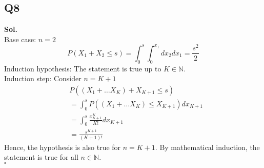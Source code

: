\documentclass[12pt]{article}
\begin{document}
\subsection*{Q8}
\textbf{Sol.} \\
Base case: \(n = 2\)
\[
   P(X_1 + X_2 \leq  s) = \int_0^s \int_0^{x_1}  dx_2 dx_1 = \frac{s^2}{2}   
\] 
Induction hypothesis: The statement is true up to \(K \in \mathbb{N}\). \\ 
Induction step: Consider \(n = K +1\)
\begin{equation*}
    \begin{aligned}
        & P((X_1 + \dots X_K) + X_{K+1} \leq s)
        \\ &= \int_0^s P( (X_1 + \dots X_K) \leq  X_{K+1} ) dx_{K+1} 
        \\ &= \int_0^s \frac{x_{K+1}^K}{K!} dx_{K+1} 
        \\ &= \frac{s^{K+1}}{(K+1)!}
    \end{aligned}
\end{equation*} 
Hence, the hypothesis is also true for \(n = K +1\). 
By mathematical induction, the statement is true for all \(n\in \mathbb{N}\). 
\\ \hspace{\textwidth}\(\square\)   
\end{document}
